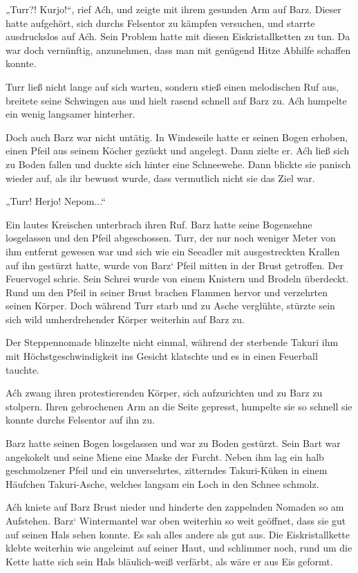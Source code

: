 „Turr?! Kurjo!“, rief Aćh, und zeigte mit ihrem gesunden Arm auf Barz. Dieser hatte aufgehört, sich durchs Felsentor zu kämpfen versuchen, und starrte ausdruckslos auf Aćh. Sein Problem hatte mit diesen Eiskristallketten zu tun. Da war doch vernünftig, anzunehmen, dass man mit genügend Hitze Abhilfe schaffen konnte.

Turr ließ nicht lange auf sich warten, sondern stieß einen melodischen Ruf aus, breitete seine Schwingen aus und hielt rasend schnell auf Barz zu. Aćh humpelte ein wenig langsamer hinterher.

Doch auch Barz war nicht untätig. In Windeseile hatte er seinen Bogen erhoben, einen Pfeil aus seinem Köcher gezückt und angelegt. Dann zielte er. Aćh ließ sich zu Boden fallen und duckte sich hinter eine Schneewehe. Dann blickte sie panisch wieder auf, als ihr bewusst wurde, dass vermutlich nicht sie das Ziel war.

„Turr! Herjo! Nepom...“

Ein lautes Kreischen unterbrach ihren Ruf. Barz hatte seine Bogensehne losgelassen und den Pfeil abgeschossen. Turr, der nur noch weniger Meter von ihm entfernt gewesen war und sich wie ein Seeadler mit ausgestreckten Krallen auf ihn gestürzt hatte, wurde von Barz‘ Pfeil mitten in der Brust getroffen. Der Feuervogel schrie. Sein Schrei wurde von einem Knistern und Brodeln überdeckt. Rund um den Pfeil in seiner Brust brachen Flammen hervor und verzehrten seinen Körper. Doch während Turr starb und zu Asche verglühte, stürzte sein sich wild umherdrehender Körper weiterhin auf Barz zu.

Der Steppennomade blinzelte nicht einmal, während der sterbende Takuri ihm mit Höchstgeschwindigkeit ins Gesicht klatschte und es in einen Feuerball tauchte.

Aćh zwang ihren protestierenden Körper, sich aufzurichten und zu Barz zu stolpern. Ihren gebrochenen Arm an die Seite gepresst, humpelte sie so schnell sie konnte durchs Felsentor auf ihn zu.

Barz hatte seinen Bogen losgelassen und war zu Boden gestürzt. Sein Bart war angekokelt und seine Miene eine Maske der Furcht. Neben ihm lag ein halb geschmolzener Pfeil und ein unversehrtes, zitterndes Takuri-Küken in einem Häufchen Takuri-Asche, welches langsam ein Loch in den Schnee schmolz.

Aćh kniete auf Barz Brust nieder und hinderte den zappelnden Nomaden so am Aufstehen. Barz‘ Wintermantel war oben weiterhin so weit geöffnet, dass sie gut auf seinen Hals sehen konnte. Es sah alles andere als gut aus. Die Eiskristallkette klebte weiterhin wie angeleimt auf seiner Haut, und schlimmer noch, rund um die Kette hatte sich sein Hals bläulich-weiß verfärbt, als wäre er aus Eis geformt.


